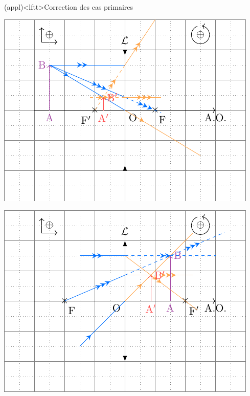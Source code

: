 \documentclass[../../main/main.tex]{subfiles}
\begin{document}
\begin{tcn}[label=impo:cons_exem](appl)<lftt>{Correction des cas primaires}
	\begin{minipage}{0.50\linewidth}
		\begin{center}
			\includegraphics[width=\linewidth]{lent_div-constru_simple}
			\label{fig:corrdivconstrusimple}
		\end{center}
	\end{minipage}
	\hfill
	\begin{minipage}{0.50\linewidth}
		\begin{center}
			\includegraphics[width=\linewidth]{lent_conv-constru_after}

\end{center}
\end{minipage}
\end{tcn}
\end{document}
